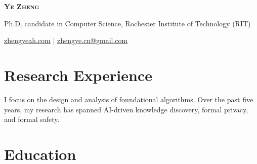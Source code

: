 \documentclass[a4paper,11pt]{article}
\newcommand{\topicon}[1]{\raisebox{0.01em}{\resizebox{!}{0.7em}{#1}}}
\newcommand{\headerfontiii}{\fontfamily{ppl}\selectfont} %
\begin{document}
\headerfontiii

\begin{center}
    {\Huge\textbf{\scshape Ye Zheng}}
\end{center}
\vspace{-3mm}

\begin{center}
  \small{Ph.D. candidate in Computer Science, Rochester Institute of Technology (RIT)}
\end{center}
\vspace{-6mm}
\begin{center}
    \small{\topicon{\faGlobe} \href{https://zhengyeah.com}{zhengyeah.com} | 
    \topicon{\faMailBulk} \href{mailto:zhengye.cn@gmail.com}{zhengye.cn@gmail.com}}
\end{center}

\section{\textbf{Research Experience}}

I focus on the design and analysis of foundational algorithms. 
Over the past five years, my research has spanned AI-driven knowledge discovery, formal privacy, and formal safety.

\section{\textbf{Education}}
\end{document}
